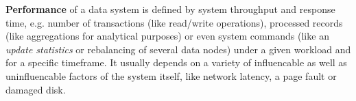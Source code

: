 \hspace*{4mm}%
\begin{minipage}{0.8\textwidth}\raggedright
\textbf{Performance} of a data system is defined by system throughput and response time, e.g. number of transactions (like read/write operations), processed records (like aggregations for analytical purposes) or even system commands (like an \textit{update statistics} or rebalancing of several data nodes) under a given workload and for a specific timeframe. It usually depends on a variety of influencable as well as uninfluencable factors of the system itself, like network latency, a page fault or damaged disk. \\[0.4 cm]
\end{minipage}\\

